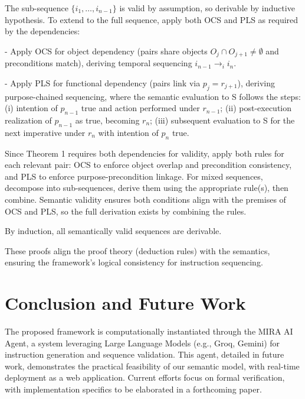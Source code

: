 \documentclass[a4paper,11pt]{lmcs}
\begin{document}
The sub-sequence \( \{i_1, \dots, i_{n-1}\} \) is valid by assumption, so derivable by inductive hypothesis. To extend to the full sequence, apply both OCS and PLS as required by the dependencies:

- Apply OCS for object dependency (pairs share objects \( O_j \cap O_{j+1} \neq \emptyset \) and preconditions match), deriving temporal sequencing \( i_{n-1} \rightarrow_i i_n \).

- Apply PLS for functional dependency (pairs link via \( p_j = r_{j+1} \)), deriving purpose-chained sequencing, where the semantic evaluation to S follows the steps: (i) intention of \( p_{n-1} \) true and action performed under \( r_{n-1} \); (ii) post-execution realization of \( p_{n-1} \) as true, becoming \( r_n \); (iii) subsequent evaluation to S for the next imperative under \( r_n \) with intention of \( p_n \) true.

Since Theorem 1 requires both dependencies for validity, apply both rules for each relevant pair: OCS to enforce object overlap and precondition consistency, and PLS to enforce purpose-precondition linkage. For mixed sequences, decompose into sub-sequences, derive them using the appropriate rule(s), then combine. Semantic validity ensures both conditions align with the premises of OCS and PLS, so the full derivation exists by combining the rules.

By induction, all semantically valid sequences are derivable.

These proofs align the proof theory (deduction rules) with the semantics, ensuring the framework's logical consistency for instruction sequencing.



\section{Conclusion and Future Work}
\label{sec:conclude}



The proposed framework is computationally instantiated through the MIRA AI Agent, a system leveraging Large Language Models (e.g., Groq, Gemini) for instruction generation and sequence validation. This agent, detailed in future work, demonstrates the practical feasibility of our semantic model, with real-time deployment as a web application. Current efforts focus on formal verification, with implementation specifics to be elaborated in a forthcoming paper.




\end{document}
